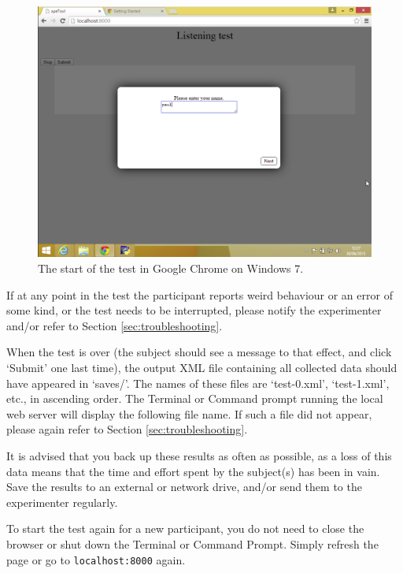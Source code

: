 \documentclass[11pt, oneside]{article}   	%
\begin{document}
			\begin{figure}[htb]
                        \begin{center}
                        \includegraphics[width=.8\textwidth]{test.png}
                        \caption{The start of the test in Google Chrome on Windows 7.}
                        \label{fig:test}
                        \end{center}
                        \end{figure}
                        
                        If at any point in the test the participant reports weird behaviour or an error of some kind, or the test needs to be interrupted, please notify the experimenter and/or refer to Section \ref{sec:troubleshooting}. 
			
			When the test is over (the subject should see a message to that effect, and click `Submit' one last time), the output XML file containing all collected data should have appeared in `saves/'. The names of these files are `test-0.xml', `test-1.xml', etc., in ascending order. The Terminal or Command prompt running the local web server will display the following file name. If such a file did not appear, please again refer to Section \ref{sec:troubleshooting}. 
			
			It is advised that you back up these results as often as possible, as a loss of this data means that the time and effort spent by the subject(s) has been in vain. Save the results to an external or network drive, and/or send them to the experimenter regularly. 
			
			To start the test again for a new participant, you do not need to close the browser or shut down the Terminal or Command Prompt. Simply refresh the page or go to \texttt{localhost:8000} again. 
			
\end{document}
